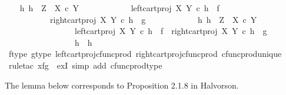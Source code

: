 \begin{isabellebody}
\ \ \isamarkupfalse%
\ {\isachardoublequoteopen}{\isasymexists}h{\isachardot}{\kern0pt}\ h\ {\isacharcolon}{\kern0pt}\ Z\ {\isasymrightarrow}\ X\ {\isasymtimes}\isactrlsub c\ Y\ {\isasymand}\isanewline
\ \ \ \ \ \ \ \ \ \ \ left{\isacharunderscore}{\kern0pt}cart{\isacharunderscore}{\kern0pt}proj\ X\ Y\ {\isasymcirc}\isactrlsub c\ h\ {\isacharequal}{\kern0pt}\ f\ {\isasymand}\isanewline
\ \ \ \ \ \ \ \ \ \ \ right{\isacharunderscore}{\kern0pt}cart{\isacharunderscore}{\kern0pt}proj\ X\ Y\ {\isasymcirc}\isactrlsub c\ h\ {\isacharequal}{\kern0pt}\ g\ {\isasymand}\isanewline
\ \ \ \ \ \ \ \ \ \ \ {\isacharparenleft}{\kern0pt}{\isasymforall}h{}{\isachardot}{\kern0pt}\ h{}\ {\isacharcolon}{\kern0pt}\ Z\ {\isasymrightarrow}\ X\ {\isasymtimes}\isactrlsub c\ Y\ {\isasymand}\isanewline
\ \ \ \ \ \ \ \ \ \ \ \ \ \ \ \ \ left{\isacharunderscore}{\kern0pt}cart{\isacharunderscore}{\kern0pt}proj\ X\ Y\ {\isasymcirc}\isactrlsub c\ h{}\ {\isacharequal}{\kern0pt}\ f\ {\isasymand}\ right{\isacharunderscore}{\kern0pt}cart{\isacharunderscore}{\kern0pt}proj\ X\ Y\ {\isasymcirc}\isactrlsub c\ h{}\ {\isacharequal}{\kern0pt}\ g\ {\isasymlongrightarrow}\isanewline
\ \ \ \ \ \ \ \ \ \ \ \ \ \ \ \ \ h{}\ {\isacharequal}{\kern0pt}\ h{\isacharparenright}{\kern0pt}{\isachardoublequoteclose}\isanewline
\ \ \ \ \ \ \ \isamarkupfalse%
\ f{\isacharunderscore}{\kern0pt}type\ g{\isacharunderscore}{\kern0pt}type\ left{\isacharunderscore}{\kern0pt}cart{\isacharunderscore}{\kern0pt}proj{\isacharunderscore}{\kern0pt}cfunc{\isacharunderscore}{\kern0pt}prod\ right{\isacharunderscore}{\kern0pt}cart{\isacharunderscore}{\kern0pt}proj{\isacharunderscore}{\kern0pt}cfunc{\isacharunderscore}{\kern0pt}prod\ cfunc{\isacharunderscore}{\kern0pt}prod{\isacharunderscore}{\kern0pt}unique\isanewline
\ \ \ \ \isamarkupfalse%
\ {\isacharparenleft}{\kern0pt}rule{\isacharunderscore}{\kern0pt}tac\ x{\isacharequal}{\kern0pt}{\isachardoublequoteopen}{\isasymlangle}f{\isacharcomma}{\kern0pt}g{\isasymrangle}{\isachardoublequoteclose}\ \ exI{\isacharcomma}{\kern0pt}\ simp\ add{\isacharcolon}{\kern0pt}\ cfunc{\isacharunderscore}{\kern0pt}prod{\isacharunderscore}{\kern0pt}type{\isacharparenright}{\kern0pt}\isanewline
{}\isamarkupfalse%
%
\endisatagproof
{\isafoldproof}%
%
\isadelimproof
%
\endisadelimproof
%
\begin{isamarkuptext}%
The lemma below corresponds to Proposition 2.1.8 in Halvorson.%
\end{isamarkuptext}\isamarkuptrue%

\end{isabellebody}
